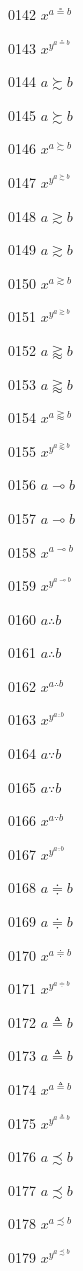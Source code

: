 \documentclass{article}
\begin{document}
0142 $x^{a\circeq b}$\par
0143 $x^{y^{a\circeq b}}$\par
0144 $a\succsim b$\par
0145 $\displaystyle a\succsim b$\par
0146 $x^{a\succsim b}$\par
0147 $x^{y^{a\succsim b}}$\par
0148 $a\gtrsim b$\par
0149 $\displaystyle a\gtrsim b$\par
0150 $x^{a\gtrsim b}$\par
0151 $x^{y^{a\gtrsim b}}$\par
0152 $a\gtrapprox b$\par
0153 $\displaystyle a\gtrapprox b$\par
0154 $x^{a\gtrapprox b}$\par
0155 $x^{y^{a\gtrapprox b}}$\par
0156 $a\multimap b$\par
0157 $\displaystyle a\multimap b$\par
0158 $x^{a\multimap b}$\par
0159 $x^{y^{a\multimap b}}$\par
0160 $a\therefore b$\par
0161 $\displaystyle a\therefore b$\par
0162 $x^{a\therefore b}$\par
0163 $x^{y^{a\therefore b}}$\par
0164 $a\because b$\par
0165 $\displaystyle a\because b$\par
0166 $x^{a\because b}$\par
0167 $x^{y^{a\because b}}$\par
0168 $a\doteqdot b$\par
0169 $\displaystyle a\doteqdot b$\par
0170 $x^{a\doteqdot b}$\par
0171 $x^{y^{a\doteqdot b}}$\par
0172 $a\triangleq b$\par
0173 $\displaystyle a\triangleq b$\par
0174 $x^{a\triangleq b}$\par
0175 $x^{y^{a\triangleq b}}$\par
0176 $a\precsim b$\par
0177 $\displaystyle a\precsim b$\par
0178 $x^{a\precsim b}$\par
0179 $x^{y^{a\precsim b}}$\par
\end{document}
